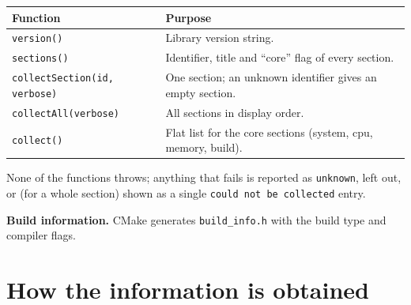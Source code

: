 \documentclass[11pt,a4paper]{article}
\newcommand{\cmd}[1]{\texttt{#1}}
\begin{document}
\begin{center}
\begin{tabular}{@{}p{6.2cm}p{8.6cm}@{}}
\toprule
Function & Purpose \\
\midrule
\texttt{version()}                    & Library version string. \\
\texttt{sections()}                   & Identifier, title and ``core'' flag of every section. \\
\texttt{collectSection(id, verbose)}  & One section; an unknown identifier gives an empty section. \\
\texttt{collectAll(verbose)}          & All sections in display order. \\
\texttt{collect()}                    & Flat list for the core sections (system, cpu, memory, build). \\
\bottomrule
\end{tabular}
\end{center}

None of the functions throws; anything that fails is reported as \texttt{unknown}, left out, or (for a whole section)
shown as a single \texttt{could not be collected} entry.

\textbf{Build information.} CMake generates \cmd{build\_info.h} with the build type and compiler flags.

\section{How the information is obtained}
\end{document}
